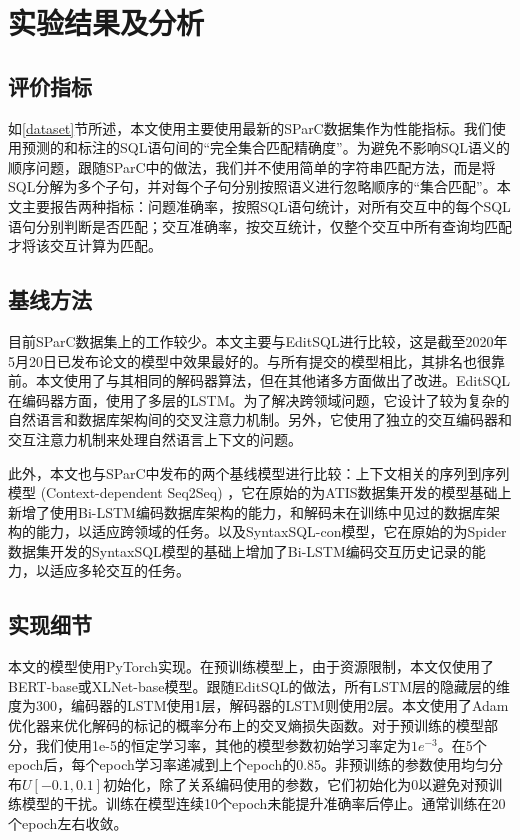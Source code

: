 \chapter{实验结果及分析}

\section{评价指标}

如\ref{dataset}节所述，本文使用主要使用最新的SParC数据集作为性能指标。我们使用预测的和标注的SQL语句间的“完全集合匹配精确度”。为避免不影响SQL语义的顺序问题，跟随SParC\cite{sparc19}中的做法，我们并不使用简单的字符串匹配方法，而是将SQL分解为多个子句，并对每个子句分别按照语义进行忽略顺序的“集合匹配”。本文主要报告两种指标：问题准确率，按照SQL语句统计，对所有交互中的每个SQL语句分别判断是否匹配；交互准确率，按交互统计，仅整个交互中所有查询均匹配才将该交互计算为匹配。

\section{基线方法}

目前SParC数据集上的工作较少。本文主要与EditSQL进行比较，这是截至2020年5月20日已发布论文的模型中效果最好的。与所有提交的模型相比，其排名也很靠前。本文使用了与其相同的解码器算法，但在其他诸多方面做出了改进。EditSQL在编码器方面，使用了多层的LSTM。为了解决跨领域问题，它设计了较为复杂的自然语言和数据库架构间的交叉注意力机制。另外，它使用了独立的交互编码器和交互注意力机制来处理自然语言上下文的问题。

此外，本文也与SParC\cite{sparc19}中发布的两个基线模型进行比较：上下文相关的序列到序列模型 (Context-dependent Seq2Seq) ，它在原始的为ATIS数据集开发的模型基础上新增了使用Bi-LSTM编码数据库架构的能力，和解码未在训练中见过的数据库架构的能力，以适应跨领域的任务。以及SyntaxSQL-con模型，它在原始的为Spider数据集开发的SyntaxSQL\cite{yu-etal-2018-syntaxsqlnet}模型的基础上增加了Bi-LSTM编码交互历史记录的能力，以适应多轮交互的任务。

\section{实现细节}

本文的模型使用PyTorch\cite{pytorch19}实现。在预训练模型上，由于资源限制，本文仅使用了BERT-base或XLNet-base模型。跟随EditSQL的做法，所有LSTM层的隐藏层的维度为300，编码器的LSTM使用1层，解码器的LSTM则使用2层。本文使用了Adam\cite{Adam14}优化器来优化解码的标记的概率分布上的交叉熵损失函数。对于预训练的模型部分，我们使用1e-5的恒定学习率，其他的模型参数初始学习率定为$1e^{-3}$。在5个epoch后，每个epoch学习率递减到上个epoch的0.85。非预训练的参数使用均匀分布$U\left[-0.1,0.1\right]$初始化，除了关系编码使用的参数，它们初始化为0以避免对预训练模型的干扰。训练在模型连续10个epoch未能提升准确率后停止。通常训练在20个epoch左右收敛。


